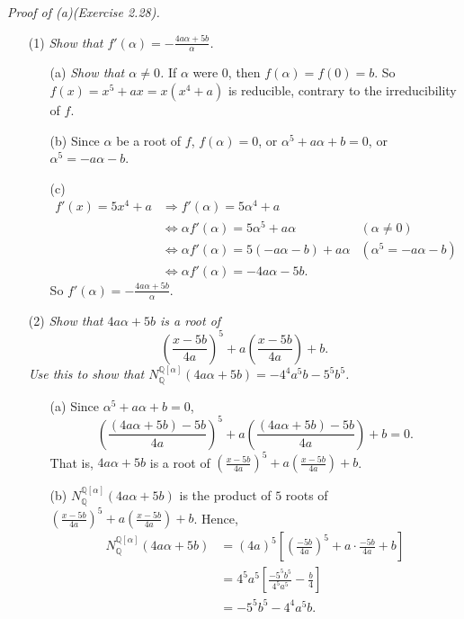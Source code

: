 \documentclass{article}
\begin{document}
\emph{Proof of (a)(Exercise 2.28).}
\begin{enumerate}
\item[(1)]
\emph{Show that $f'(\alpha) = -\frac{4a\alpha+5b}{\alpha}$.}
  \begin{enumerate}
  \item[(a)]
    \emph{Show that $\alpha \neq 0$.}
    If $\alpha$ were $0$, then $f(\alpha) = f(0) = b$.
    So $f(x) = x^5+ax = x(x^4+a)$ is reducible, contrary to the irreducibility of $f$.

  \item[(b)]
    Since $\alpha$ be a root of $f$,
    $f(\alpha) = 0$,
    or $\alpha^5 + a\alpha + b = 0$,
    or $\alpha^5 = -a\alpha-b$.

  \item[(c)]
    \begin{align*}
      f'(x) = 5x^4 + a
      &\Longrightarrow
      f'(\alpha) = 5\alpha^4 + a \\
      &\Longleftrightarrow
      \alpha f'(\alpha) = 5\alpha^5 + a\alpha
        &(\alpha \neq 0) \\
      &\Longleftrightarrow
      \alpha f'(\alpha) = 5(-a\alpha-b) + a\alpha
        &(\alpha^5 = -a\alpha-b) \\
      &\Longleftrightarrow
      \alpha f'(\alpha) = -4a\alpha-5b.
    \end{align*}
    So $f'(\alpha) = -\frac{4a\alpha+5b}{\alpha}$.
  \end{enumerate}

\item[(2)]
  \emph{Show that $4a\alpha+5b$ is a root of
  $$\left( \frac{x-5b}{4a} \right)^5 + a\left( \frac{x-5b}{4a} \right) + b.$$
  Use this to show that
  $N_{\mathbb{Q}}^{\mathbb{Q}[\alpha]}(4a\alpha+5b) = -4^4a^5b-5^5b^5$.}
  \begin{enumerate}
  \item[(a)]
    Since $\alpha^5 + a\alpha + b = 0$,
    \[
      \left( \frac{(4a\alpha+5b)-5b}{4a} \right)^5
      + a\left( \frac{(4a\alpha+5b)-5b}{4a} \right) + b = 0.
    \]
    That is, $4a\alpha+5b$ is a root of
    $\left( \frac{x-5b}{4a} \right)^5 + a\left( \frac{x-5b}{4a} \right) + b$.

  \item[(b)]
    $N_{\mathbb{Q}}^{\mathbb{Q}[\alpha]}(4a\alpha+5b)$ is the product of $5$ roots of
    $\left( \frac{x-5b}{4a} \right)^5 + a\left( \frac{x-5b}{4a} \right) + b$.
    Hence,
    \begin{align*}
      N_{\mathbb{Q}}^{\mathbb{Q}[\alpha]}(4a\alpha+5b)
      &= (4a)^5\left[ \left(\frac{-5b}{4a}\right)^5 + a \cdot \frac{-5b}{4a} + b \right] \\
      &= 4^5a^5\left[ \frac{-5^5b^5}{4^5a^5} - \frac{b}{4} \right] \\
      &= -5^5b^5-4^4a^5b.
    \end{align*}
  \end{enumerate}


\end{enumerate}
\end{document}

